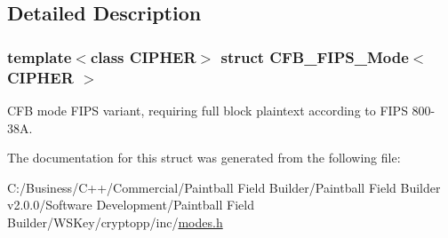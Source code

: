 \subsection{Detailed Description}
\subsubsection*{template$<$class CIPHER$>$ struct CFB\_\-FIPS\_\-Mode$<$ CIPHER $>$}

CFB mode FIPS variant, requiring full block plaintext according to FIPS 800-\/38A. 

The documentation for this struct was generated from the following file:\begin{DoxyCompactItemize}
\item 
C:/Business/C++/Commercial/Paintball Field Builder/Paintball Field Builder v2.0.0/Software Development/Paintball Field Builder/WSKey/cryptopp/inc/\hyperlink{modes_8h}{modes.h}\end{DoxyCompactItemize}
